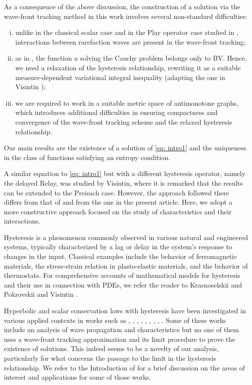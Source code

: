 \documentclass[12pt]{article}
\newcommand{\1}{\mathds{1}}
\theoremstyle{definition}
\begin{document}
As a consequence of the above discussion, the construction of a solution via the wave-front tracking method in this work involves several non-standard difficulties:
\begin{enumerate}[i)]
    \item unlike in the classical scalar case and in the Play operator case studied in \cite{BFMS}, interactions between rarefaction waves are present in the wave-front tracking;
    \item as in \cite{BFMS}, the function $u$ solving the Cauchy problem belongs only to BV. Hence, we need a relaxation of the hysteresis relationship, rewriting it as a suitable measure-dependent variational integral inequality (adapting the one in Visintin \cite{AVH});
    \item we are required to work in a suitable metric space of antimonotone graphs, which introduces additional difficulties in ensuring compactness and convergence of the wave-front tracking scheme and the relaxed hysteresis relationship.
\end{enumerate}
Our main results are the existence of a solution of \eqref{eq: intro1} and the uniqueness in the class of functions satisfying an entropy condition. 

A similar equation to \eqref{eq: intro1} but with a different hysteresis operator, namely the delayed Relay, was studied \cite{AVH1} by Visintin, where it is remarked that the results can be extended to the Preisach case. However, the approach followed there differs from that of \cite{BFMS} and from the one in the present article. Here, we adopt a more constructive approach focused on the study of characteristics and their interactions. 

Hysteresis is a phenomenon commonly observed in various natural and engineered systems, typically characterized by a lag or delay in the system’s response to changes in the input. Classical examples include the behavior of ferromagnetic materials, the stress-strain relation in plasto-elastic materials, and the behavior of thermostats. For comprehensive accounts of mathematical models for hysteresis and their use in connection with PDEs, we refer the reader to Krasnoselskii and Pokrovskii \cite{CORR1} and Visintin \cite{AVH}.

Hyperbolic and scalar conservation laws with hysteresis have been investigated in various applied contexts in works such as \cite{Simile}, \cite{ZHANG}, \cite{marchesin}, \cite{KOP1}, \cite{KOR1}, \cite{CF1}, \cite{MR}, \cite{CF2}, \cite{CF3}. Some of these works include an analysis of wave propagation and characteristics but no one of them uses a wave-front tracking approximation and its limit procedure to prove the existence of solutions. This indeed seems to be a novelty of our analysis, particularly for what concerns the passage to the limit in the hysteresis relationship. We refer to the Introduction of \cite{BFMS} for a brief discussion on the areas of interest and applications for some of those works. 
\end{document}
